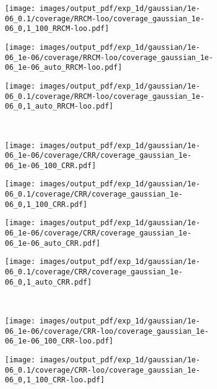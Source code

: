 \documentclass[a4paper,14pt]{extarticle}
\begin{document}
\begin{figure}
\begin{subfigure}[b]{0.25\linewidth}
  \end{subfigure}%
  \begin{subfigure}[b]{0.25\linewidth}
    \texttt{[image: images/output\_pdf/exp\_1d/gaussian/1e-06\_0.1/coverage/RRCM-loo/coverage\_gaussian\_1e-06\_0,1\_100\_RRCM-loo.pdf]}
  \end{subfigure}%
  \begin{subfigure}[b]{0.25\linewidth}
    \texttt{[image: images/output\_pdf/exp\_1d/gaussian/1e-06\_1e-06/coverage/RRCM-loo/coverage\_gaussian\_1e-06\_1e-06\_auto\_RRCM-loo.pdf]}
  \end{subfigure}%
  \begin{subfigure}[b]{0.25\linewidth}
    \texttt{[image: images/output\_pdf/exp\_1d/gaussian/1e-06\_0.1/coverage/RRCM-loo/coverage\_gaussian\_1e-06\_0,1\_auto\_RRCM-loo.pdf]}
  \end{subfigure}\\
  \begin{subfigure}[b]{0.25\linewidth}
    \texttt{[image: images/output\_pdf/exp\_1d/gaussian/1e-06\_1e-06/coverage/CRR/coverage\_gaussian\_1e-06\_1e-06\_100\_CRR.pdf]}
  \end{subfigure}%
  \begin{subfigure}[b]{0.25\linewidth}
    \texttt{[image: images/output\_pdf/exp\_1d/gaussian/1e-06\_0.1/coverage/CRR/coverage\_gaussian\_1e-06\_0,1\_100\_CRR.pdf]}
  \end{subfigure}%
  \begin{subfigure}[b]{0.25\linewidth}
    \texttt{[image: images/output\_pdf/exp\_1d/gaussian/1e-06\_1e-06/coverage/CRR/coverage\_gaussian\_1e-06\_1e-06\_auto\_CRR.pdf]}
  \end{subfigure}%
  \begin{subfigure}[b]{0.25\linewidth}
    \texttt{[image: images/output\_pdf/exp\_1d/gaussian/1e-06\_0.1/coverage/CRR/coverage\_gaussian\_1e-06\_0,1\_auto\_CRR.pdf]}
  \end{subfigure}\\
  \begin{subfigure}[b]{0.25\linewidth}
    \texttt{[image: images/output\_pdf/exp\_1d/gaussian/1e-06\_1e-06/coverage/CRR-loo/coverage\_gaussian\_1e-06\_1e-06\_100\_CRR-loo.pdf]}
  \end{subfigure}%
  \begin{subfigure}[b]{0.25\linewidth}
    \texttt{[image: images/output\_pdf/exp\_1d/gaussian/1e-06\_0.1/coverage/CRR-loo/coverage\_gaussian\_1e-06\_0,1\_100\_CRR-loo.pdf]}

\end{subfigure}
\end{figure}
\end{document}
